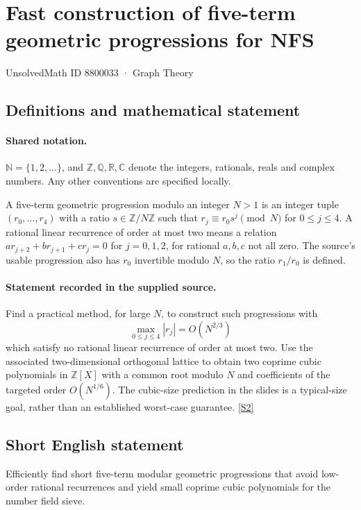 \documentclass[11pt]{article}
\newcommand{\sref}[2]{\hyperlink{source:#1:#2}{[S#2]}}
\begin{document}
\setcounter{section}{8800032}
\section{Fast construction of five-term geometric progressions for NFS}\label{8800033}
{\small\sffamily UnsolvedMath ID 8800033 · Graph Theory}
\subsection{Definitions and mathematical statement}

\paragraph{Shared notation.}$\mathbb N=\{1,2,\ldots\}$, and $\mathbb Z,\mathbb Q,\mathbb R,\mathbb C$ denote the integers, rationals, reals and complex numbers. Any other conventions are specified locally.


A five-term geometric progression modulo an integer $N>1$ is an integer tuple $(r_0,\ldots,r_4)$ with a ratio $s\in\mathbb Z/N\mathbb Z$ such that $r_j\equiv r_0s^j\pmod N$ for $0\le j\le4$. A rational linear recurrence of order at most two means a relation $a r_{j+2}+b r_{j+1}+c r_j=0$ for $j=0,1,2$, for rational $a,b,c$ not all zero. The source's usable progression also has $r_0$ invertible modulo $N$, so the ratio $r_1/r_0$ is defined.
\paragraph{Statement recorded in the supplied source.}
Find a practical method, for large $N$, to construct such progressions with
\[
\max_{0\le j\le4}|r_j|=O(N^{2/3})
\]
which satisfy no rational linear recurrence of order at most two. Use the associated two-dimensional orthogonal lattice to obtain two coprime cubic polynomials in $\mathbb Z[X]$ with a common root modulo $N$ and coefficients of the targeted order $O(N^{1/6})$. The cubic-size prediction in the slides is a typical-size goal, rather than an established worst-case guarantee. \sref{8800033}{2}

\subsection{Short English statement}
Efficiently find short five-term modular geometric progressions that avoid low-order rational recurrences and yield small coprime cubic polynomials for the number field sieve.
\end{document}
